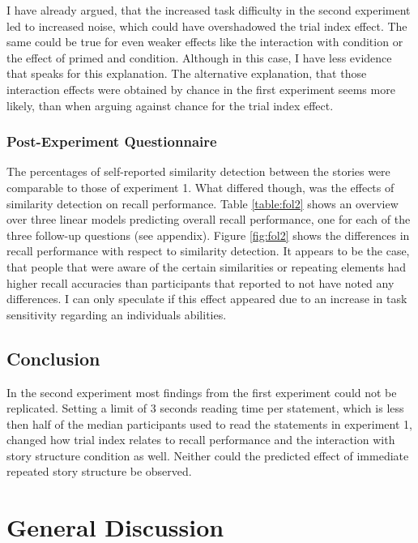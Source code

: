 \documentclass[a4paper,man,natbib,floatsintext,import]{apa6}
\begin{document}
I have already argued, that the increased task difficulty in the second experiment led to increased noise, which could have overshadowed the trial index effect. The same could be true for even weaker effects like the interaction with condition or the effect of primed and condition. Although in this case, I have less evidence that speaks for this explanation. The alternative explanation, that those interaction effects were obtained by chance in the first experiment seems more likely, than when arguing against chance for the trial index effect.



\subsubsection{Post-Experiment Questionnaire}
The percentages of self-reported similarity detection between the stories were comparable to those of experiment 1. What differed though, was the effects of similarity detection on recall performance. Table \ref{table:fol2} shows an overview over three linear models predicting overall recall performance, one for each of the three follow-up questions (see appendix). Figure \ref{fig:fol2} shows the differences in recall performance with respect to similarity detection. It appears to be the case, that people that were aware of the certain similarities or repeating elements had higher recall accuracies than participants that reported to not have noted any differences. I can only speculate if this effect appeared due to an increase in task sensitivity regarding an individuals abilities.

\subsection{Conclusion}
In the second experiment most findings from the first experiment could not be replicated. Setting a limit of 3 seconds reading time per statement, which is less then half of the median participants used to read the statements in experiment 1, changed how trial index relates to recall performance and the interaction with story structure condition as well. Neither could the predicted effect of immediate repeated story structure be observed.

\newpage
\section{General Discussion}
\end{document}
